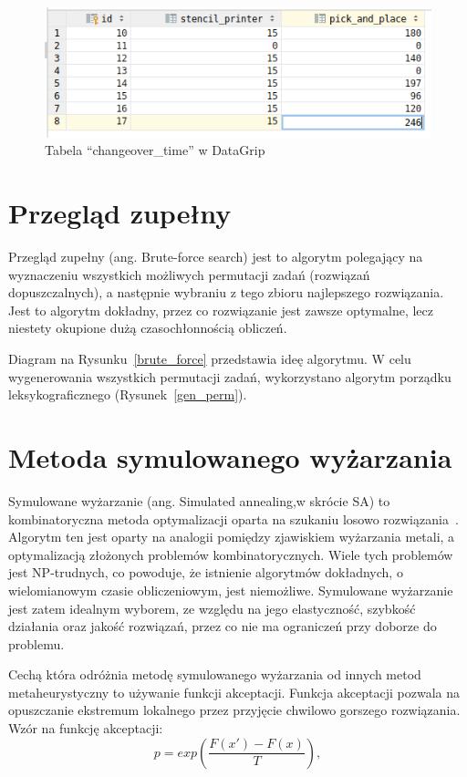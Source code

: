 \begin{figure}[H]
	\centering
	\includegraphics[scale=0.9]{chapters/chapter4/changeover_db.png}
	\caption{Tabela ``changeover\_time'' w DataGrip}
	\label{dg:changeover}
\end{figure}

\section{Przegląd zupełny}

Przegląd zupełny (ang. Brute-force search) jest to algorytm polegający na wyznaczeniu wszystkich możliwych permutacji zadań (rozwiązań dopuszczalnych), a następnie wybraniu z tego zbioru najlepszego rozwiązania. Jest to algorytm dokładny, przez co rozwiązanie jest zawsze optymalne, lecz niestety okupione dużą czasochłonnością obliczeń.

Diagram na Rysunku~\ref{brute_force} przedstawia ideę algorytmu. W celu wygenerowania wszystkich permutacji zadań, wykorzystano algorytm porządku leksykograficznego (Rysunek~\ref{gen_perm}).

\section{Metoda symulowanego wyżarzania}
Symulowane wyżarzanie (ang. Simulated annealing,w skrócie SA) to kombinatoryczna metoda optymalizacji oparta na szukaniu losowo rozwiązania~\cite{sa}. Algorytm ten jest oparty na analogii pomiędzy zjawiskiem wyżarzania metali, a optymalizacją złożonych problemów kombinatorycznych. Wiele tych problemów jest NP-trudnych, co powoduje, że istnienie algorytmów dokładnych, o wielomianowym czasie obliczeniowym, jest niemożliwe. Symulowane wyżarzanie jest zatem idealnym wyborem, ze względu na jego elastyczność, szybkość działania oraz jakość rozwiązań, przez co nie ma ograniczeń przy doborze do problemu.

Cechą która odróżnia metodę symulowanego wyżarzania od innych metod metaheurystyczny to używanie funkcji akceptacji. Funkcja akceptacji pozwala na opuszczanie ekstremum lokalnego przez przyjęcie chwilowo gorszego rozwiązania. Wzór na funkcję akceptacji:
\begin{equation}
	p=exp(\frac{F(x')-F(x)}{T}),
\end{equation}

